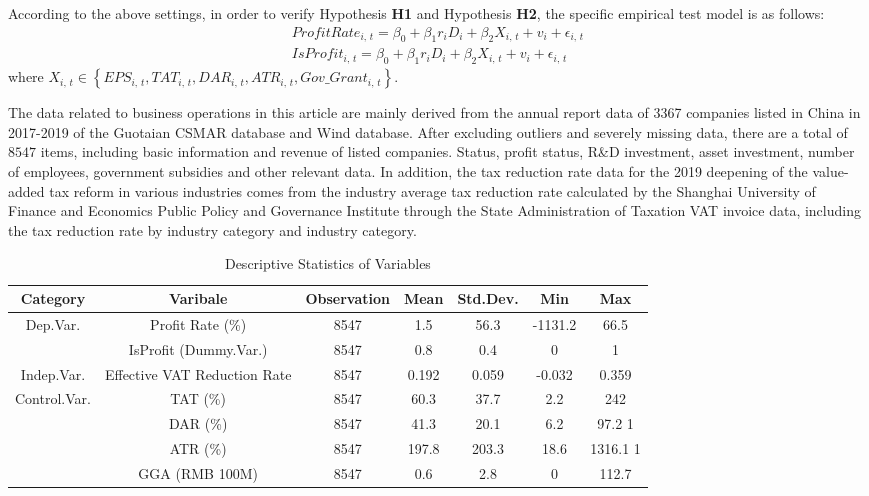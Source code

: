 \documentclass[3p,times]{elsarticle}
\begin{document}
According to the above settings, in order to verify Hypothesis \textbf{H1} and Hypothesis \textbf{H2}, the specific empirical test model is as follows:
\begin{equation}
    \begin{split}
        ProfitRate_{i, \, t} = \beta_0 + \beta_1 r_{i} D_i + \beta_2 X_{i, \, t} + v_i + \epsilon_{i,\,t}\\
        IsProfit_{i, \, t} = \beta_0 + \beta_1 r_{i} D_i + \beta_2 X_{i, \, t} + v_i + \epsilon_{i,\,t}
    \end{split}
\end{equation}
where $X_{i, \, t}\in\left\{EPS_{i, \, t},TAT_{i, \, t},DAR_{i, \, t},ATR_{i, \, t},Gov\_Grant_{i, \, t}\right\}$.

The data related to business operations in this article are mainly derived from the annual report data of 3367 companies listed in China in 2017-2019 of the Guotaian CSMAR database and Wind database. After excluding outliers and severely missing data, there are a total of $8547$ items, including basic information and revenue of listed companies. Status, profit status, R\&D investment, asset investment, number of employees, government subsidies and other relevant data. In addition, the tax reduction rate data for the 2019 deepening of the value-added tax reform in various industries comes from the industry average tax reduction rate calculated by the Shanghai University of Finance and Economics Public Policy and Governance Institute through the State Administration of Taxation VAT invoice data, including the tax reduction rate by industry category and industry category.
\begin{table}[htp!]
\caption{Descriptive Statistics of Variables}
    \centering
    \begin{tabular}{c|c|c|c|c|c|c}
    \toprule\toprule
        Category & Varibale & Observation & Mean & Std.Dev. & Min & Max\\
         \hline
        \multirow{2}{*}{Dep.Var.} & Profit Rate (\%) & 8547 &	1.5	&56.3&	-1131.2	&66.5 \\\cline{2-7}&IsProfit (Dummy.Var.)&8547&	0.8	&0.4&	0&	1\\
        \hline
        {Indep.Var.} & Effective VAT Reduction Rate & 8547	 & 0.192 & 	0.059 & 	-0.032 & 	0.359\\
        \hline
        \multirow{4}{*}{Control.Var.} & TAT (\%) &8547	&60.3&	37.7&	2.2&	242 \\\cline{2-7}&DAR (\%)&8547&	41.3	&20.1&	6.2&	97.2	1\\\cline{2-7}&ATR (\%)&8547&197.8&	203.3&	18.6	&1316.1	1\\\cline{2-7}&GGA (RMB 100M)&8547&0.6	&2.8&	0&	112.7\\
    \bottomrule
    \end{tabular}
    \label{tab:Descriptive_stat}
\end{table}
\end{document}
